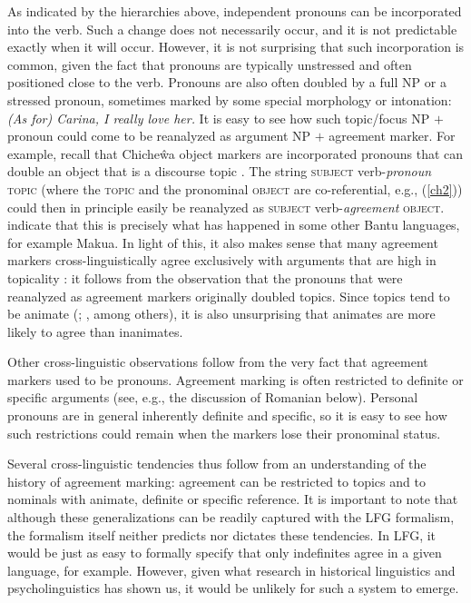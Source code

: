 \documentclass[output=paper,hidelinks]{langscibook}
\begin{document}
 As indicated by the hierarchies above, independent pronouns can be incorporated into the verb. Such a change does not necessarily occur, and it is not predictable exactly when it will occur.  However, it is   not surprising that such incorporation is common, given the fact that pronouns are typically unstressed and often positioned close to the verb.  Pronouns are also often doubled by a full NP or a stressed pronoun, sometimes marked by some  special morphology or intonation: \textit{(As for) Carina, I really love her.}  It is easy to see how such   topic/focus NP $+$ pronoun   could come to be reanalyzed   as  argument NP $+$ agreement marker.  For example, recall that Chiche\^{w}a object markers are incorporated pronouns that can double an object that is a discourse topic   \citep{BM87}.  The string \textsc{subject} verb-\textit{pronoun} \textsc{topic}  (where the \textsc{topic} and the pronominal \textsc{object} are co-referential, e.g., (\ref{ch2})) could  then in principle easily be reanalyzed as \textsc{subject} verb-\textit{agreement} \textsc{object}.  \citet{BM87} indicate that this is  precisely what has happened in  some other Bantu languages, for example Makua.   In light of this, it also makes sense that many  agreement markers cross-linguistically agree exclusively with arguments that are high in topicality \citep{comrie81, woolford99, CoppockWechsler2010, DN}: it follows from the observation that the pronouns that were reanalyzed as agreement markers  originally doubled topics. Since topics tend to be animate  (\citealt[225]{comrie81}; \citealt{arnold13}, among others), it is also unsurprising that animates are more likely to agree than inanimates.
 
 Other cross-linguistic observations follow from the  very fact that agreement markers used to be pronouns.  Agreement marking is often restricted to definite or specific arguments (see, e.g., the discussion of Romanian below).  Personal pronouns are in general inherently definite and specific, so it is easy to see how   such restrictions could remain when the markers lose their pronominal status. 
 
 Several cross-linguistic tendencies thus follow from an understanding of the history of agreement marking: agreement can be restricted to topics and to nominals with animate, definite or specific reference. It is important to note that although these generalizations can be readily captured with the LFG formalism, the formalism  itself neither predicts nor dictates these tendencies.  In LFG, it would be just as easy to formally specify  that only  indefinites   agree in a given language, for example. However, given what  research in historical linguistics and psycholinguistics has shown us, it would be  unlikely for such a system to emerge. 
 
\end{document}
